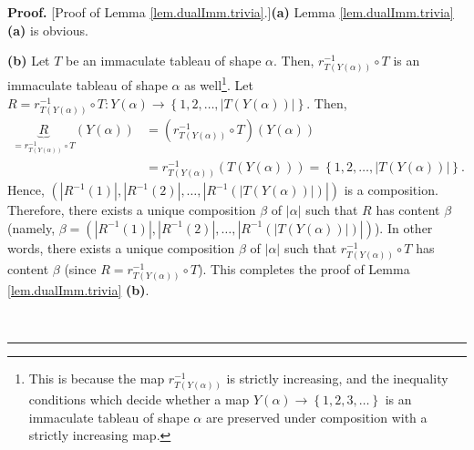 \documentclass[numbers=enddot,12pt,final,onecolumn,notitlepage,abstracton]{scrartcl}%
\theoremstyle{definition}
\newenvironment{proof}[1][Proof]{\noindent\textbf{#1.} }{\ \rule{0.5em}{0.5em}}
\begin{document}
\begin{proof}
[Proof of Lemma \ref{lem.dualImm.trivia}.]\textbf{(a)} Lemma
\ref{lem.dualImm.trivia} \textbf{(a)} is obvious.

\textbf{(b)} Let $T$ be an immaculate tableau of shape $\alpha$. Then,
$r_{T\left(  Y\left(  \alpha\right)  \right)  }^{-1}\circ T$ is an immaculate
tableau of shape $\alpha$ as well\footnote{This is because the map
$r_{T\left(  Y\left(  \alpha\right)  \right)  }^{-1}$ is strictly increasing,
and the inequality conditions which decide whether a map $Y\left(
\alpha\right)  \rightarrow\left\{  1,2,3,\ldots\right\}  $ is an immaculate
tableau of shape $\alpha$ are preserved under composition with a strictly
increasing map.}. Let $R=r_{T\left(  Y\left(  \alpha\right)  \right)  }%
^{-1}\circ T:Y\left(  \alpha\right)  \rightarrow\left\{  1,2,\ldots,\left\vert
T\left(  Y\left(  \alpha\right)  \right)  \right\vert \right\}  $. Then,%
\begin{align*}
\underbrace{R}_{=r_{T\left(  Y\left(  \alpha\right)  \right)  }^{-1}\circ
T}\left(  Y\left(  \alpha\right)  \right)   &  =\left(  r_{T\left(  Y\left(
\alpha\right)  \right)  }^{-1}\circ T\right)  \left(  Y\left(  \alpha\right)
\right) \\
&  =r_{T\left(  Y\left(  \alpha\right)  \right)  }^{-1}\left(  T\left(
Y\left(  \alpha\right)  \right)  \right)  =\left\{  1,2,\ldots,\left\vert
T\left(  Y\left(  \alpha\right)  \right)  \right\vert \right\}  .
\end{align*}
Hence, $\left(  \left\vert R^{-1}\left(  1\right)  \right\vert ,\left\vert
R^{-1}\left(  2\right)  \right\vert ,\ldots,\left\vert R^{-1}\left(
\left\vert T\left(  Y\left(  \alpha\right)  \right)  \right\vert \right)
\right\vert \right)  $ is a composition. Therefore, there exists a unique
composition $\beta$ of $\left\vert \alpha\right\vert $ such that $R$ has
content $\beta$ (namely, $\beta=\left(  \left\vert R^{-1}\left(  1\right)
\right\vert ,\left\vert R^{-1}\left(  2\right)  \right\vert ,\ldots,\left\vert
R^{-1}\left(  \left\vert T\left(  Y\left(  \alpha\right)  \right)  \right\vert
\right)  \right\vert \right)  $). In other words, there exists a unique
composition $\beta$ of $\left\vert \alpha\right\vert $ such that $r_{T\left(
Y\left(  \alpha\right)  \right)  }^{-1}\circ T$ has content $\beta$ (since
$R=r_{T\left(  Y\left(  \alpha\right)  \right)  }^{-1}\circ T$). This
completes the proof of Lemma \ref{lem.dualImm.trivia} \textbf{(b)}.


\end{proof}
\end{document}

